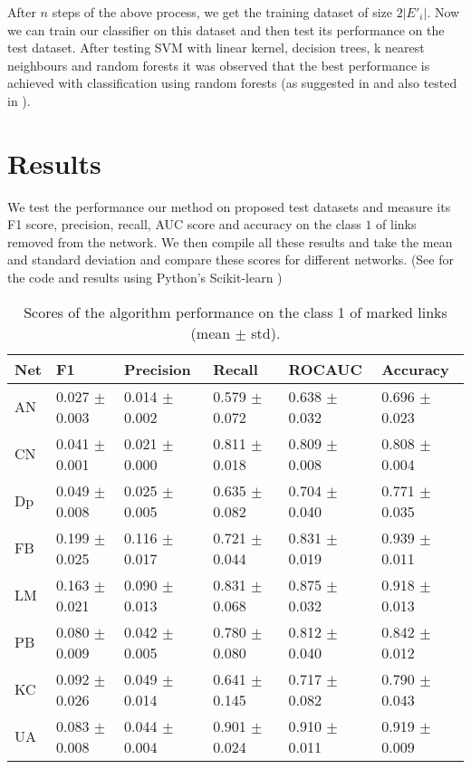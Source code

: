 \documentclass{llncs}
\begin{document}
After $n$ steps of the above process, we get the training dataset of size $2 |E'_i|$. Now we can train our classifier on this dataset and then test its performance on the test dataset. After testing SVM with linear kernel, decision trees, k nearest neighbours and random forests it was observed that the best performance is achieved with classification using random forests (as suggested in \cite{features-for-sl} and also tested in \cite{ipynb-sl}).
%
\section{Results}
%
We test the performance our method on proposed test datasets and measure its F1 score, precision, recall, AUC score and accuracy on the class $1$ of links removed from the network. We then compile all these results and take the mean and standard deviation and compare these scores for different networks. (See \cite{ipynb-sl} for the code and results using Python's Scikit-learn \cite{scikit})
%
\setlength{\tabcolsep}{5pt}
\renewcommand{\arraystretch}{1.5}
\begin{table}
\begin{center}
\caption{Scores of the algorithm performance on the class 1 of marked links (mean $\pm$ std).}
\begin{tabular}{| l | l | l | l | l | l |}
\hline
Net & F1 & Precision & Recall & ROCAUC & Accuracy  \\ \hline
AN & 0.027 $\pm$ 0.003 & 0.014 $\pm$ 0.002 & 0.579 $\pm$ 0.072 & 0.638 $\pm$ 0.032 & 0.696 $\pm$ 0.023  \\ \hline
CN & 0.041 $\pm$ 0.001 & 0.021 $\pm$ 0.000 & 0.811 $\pm$ 0.018 & 0.809 $\pm$ 0.008 & 0.808 $\pm$ 0.004  \\ \hline
Dp & 0.049 $\pm$ 0.008 & 0.025 $\pm$ 0.005 & 0.635 $\pm$ 0.082 & 0.704 $\pm$ 0.040 & 0.771 $\pm$ 0.035  \\ \hline
FB & 0.199 $\pm$ 0.025 & 0.116 $\pm$ 0.017 & 0.721 $\pm$ 0.044 & 0.831 $\pm$ 0.019 & 0.939 $\pm$ 0.011  \\ \hline
LM & 0.163 $\pm$ 0.021 & 0.090 $\pm$ 0.013 & 0.831 $\pm$ 0.068 & 0.875 $\pm$ 0.032 & 0.918 $\pm$ 0.013 \\ \hline
PB & 0.080 $\pm$ 0.009 & 0.042 $\pm$ 0.005 & 0.780 $\pm$ 0.080 & 0.812 $\pm$ 0.040 & 0.842 $\pm$ 0.012  \\ \hline
KC & 0.092 $\pm$ 0.026 & 0.049 $\pm$ 0.014 & 0.641 $\pm$ 0.145 & 0.717 $\pm$ 0.082 & 0.790 $\pm$  0.043 \\ \hline
UA & 0.083 $\pm$ 0.008 & 0.044 $\pm$ 0.004 & 0.901 $\pm$ 0.024 & 0.910 $\pm$ 0.011 & 0.919 $\pm$ 0.009  \\ 
\hline
\end{tabular}
\end{center}
\end{table}
%
\end{document}
